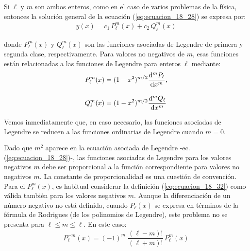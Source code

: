 Si $\ell$ y $m$ son ambos enteros, como en el caso de varios problemas de la física, entonces la solución general de la ecuación (\ref{eq:ecuacion_18_28}) se expresa por:
\begin{align}
y(x) = c_{1} \, P_{\ell}^{m} (x) + c_{2} \, Q_{\ell}^{m} (x)
\label{eq:ecuacion_18_31}
\end{align}

donde $P_{\ell}^{m} (x)$ y $Q_{\ell}^{m} (x)$ son las funciones asociadas de Legendre de primera y segunda clase, respectivamente. Para valores no negativos de $m$, esas funciones están relacionadas a las funciones de Legendre para enteros $\ell$ mediante:
\begin{align}
\begin{aligned}
P_{\ell}^{m} (x) &= (1 - x^{2})^{m/2} \dv[m]{P_{\ell}}{x}, \\[1em]
Q_{\ell}^{m} (x) &= (1 - x^{2})^{m/2} \dv[m]{Q_{\ell}}{x}
\end{aligned}
\label{eq:ecuacion_18_32}
\end{align}

Vemos inmediatamente que, en caso necesario, las funciones asociadas de Legendre se reducen a las funciones ordinarias de Legendre cuando $m = 0$. 
\par
Dado que $m^{2}$ aparece en la ecuación asociada de Legendre -ec. (\ref{eq:ecuacion_18_28})-, las funciones asociadas de Legendre para los valores negativos $m$ debe ser proporcional a la función correspondiente para valores no negativos $m$. La constante de proporcionalidad es una cuestión de convención. Para el $P_{\ell}^{m} (x) $, es habitual considerar la definición (\ref{eq:ecuacion_18_32}) como válida también para los valores negativos $m$. Aunque la diferenciación de un número negativo no está definida, cuando $P_{\ell}(x)$ se expresa en términos de la fórmula de Rodrigues (de los polinomios de Legendre), este problema no se presenta para $\ell \leq m \leq \ell$. En este caso:
\begin{align}
P_{\ell}^{-m} (x) = (-1)^{m} \; \dfrac{(\ell - m)!}{(\ell + m)!} \, P_{\ell}^{m} (x)
\label{eq:ecuacion_18_33}
\end{align}

